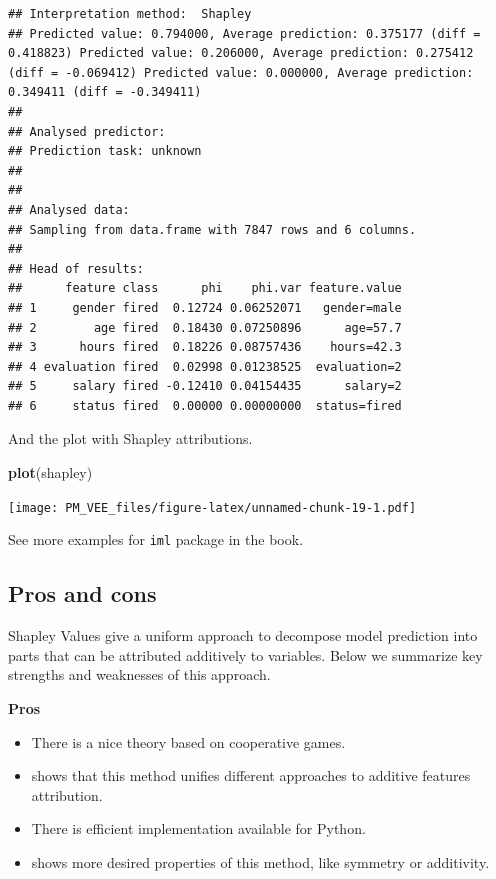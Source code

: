 \documentclass[]{krantz}
\newenvironment{Shaded}{\begin{snugshade}}{\end{snugshade}}
\newcommand{\KeywordTok}[1]{\textcolor[rgb]{0.13,0.29,0.53}{\textbf{#1}}}
\newcommand{\NormalTok}[1]{#1}
\providecommand{\tightlist}{%
  \setlength{\itemsep}{0pt}\setlength{\parskip}{0pt}}
\theoremstyle{definition}
\theoremstyle{definition}
\theoremstyle{definition}
\theoremstyle{remark}
\begin{document}
\begin{verbatim}
## Interpretation method:  Shapley 
## Predicted value: 0.794000, Average prediction: 0.375177 (diff = 0.418823) Predicted value: 0.206000, Average prediction: 0.275412 (diff = -0.069412) Predicted value: 0.000000, Average prediction: 0.349411 (diff = -0.349411)
## 
## Analysed predictor: 
## Prediction task: unknown 
## 
## 
## Analysed data:
## Sampling from data.frame with 7847 rows and 6 columns.
## 
## Head of results:
##      feature class      phi    phi.var feature.value
## 1     gender fired  0.12724 0.06252071   gender=male
## 2        age fired  0.18430 0.07250896      age=57.7
## 3      hours fired  0.18226 0.08757436    hours=42.3
## 4 evaluation fired  0.02998 0.01238525  evaluation=2
## 5     salary fired -0.12410 0.04154435      salary=2
## 6     status fired  0.00000 0.00000000  status=fired
\end{verbatim}

And the plot with Shapley attributions.

\begin{Shaded}
\begin{Highlighting}[]
\KeywordTok{plot}\NormalTok{(shapley)}
\end{Highlighting}
\end{Shaded}

\texttt{[image: PM\_VEE\_files/figure-latex/unnamed-chunk-19-1.pdf]}

See more examples for \texttt{iml} package in the \citep{molnar} book.

\hypertarget{pros-and-cons-3}{%
\subsection{Pros and cons}\label{pros-and-cons-3}}

Shapley Values give a uniform approach to decompose model prediction
into parts that can be attributed additively to variables. Below we
summarize key strengths and weaknesses of this approach.

\textbf{Pros}

\begin{itemize}
\tightlist
\item
  There is a nice theory based on cooperative games.
\item
  \citep{SHAP} shows that this method unifies different approaches to
  additive features attribution.
\item
  There is efficient implementation available for Python.
\item
  \citep{SHAP} shows more desired properties of this method, like
  symmetry or additivity.
\end{itemize}
\end{document}
